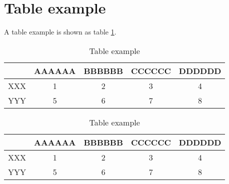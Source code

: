 \section{Table example}\label{sec:table}

A table example is shown as table \ref{tab:Table-example}.

\begin{table}[h]
\centering
\caption{Table example}\label{tab:Table-example}
\begin{tabular}{|c|c|c|c|c|}
\hline 
 & AAAAAA & BBBBBB & CCCCCC & DDDDDD\tabularnewline
\hline 
XXX & 1 & 2 & 3 & 4\tabularnewline
\hline 
YYY & 5 & 6 & 7 & 8\tabularnewline
\hline 
\end{tabular}
\end{table}


\begin{table}[h]
\centering
\caption{Table example}\label{tab:Table-example2}
\begin{tabular}{c|cccc}
\hline 
 & AAAAAA & BBBBBB & CCCCCC & DDDDDD\tabularnewline
\hline 
XXX & 1 & 2 & 3 & 4\tabularnewline
\hline 
YYY & 5 & 6 & 7 & 8\tabularnewline
\hline 
\end{tabular}
\end{table}
